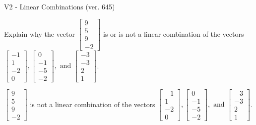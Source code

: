 \begin{exercise}
  \begin{exerciseTitle}V2 - Linear Combinations (ver. 645)\end{exerciseTitle}
  \begin{exerciseStatement}
    Explain why the vector \(\left[\begin{array}{c}
9 \\
5 \\
9 \\
-2
\end{array}\right]\)  is or is not a linear 
	combination of the vectors \(\left[\begin{array}{c}
-1 \\
1 \\
-2 \\
0
\end{array}\right] , \left[\begin{array}{c}
0 \\
-1 \\
-5 \\
-2
\end{array}\right] , \text{ and } \left[\begin{array}{c}
-3 \\
-3 \\
2 \\
1
\end{array}\right]\).
	


  \end{exerciseStatement}
  \begin{exerciseAnswer}
   \(\left[\begin{array}{c}
9 \\
5 \\
9 \\
-2
\end{array}\right]\) 
  	 is not  
	a linear combination of the vectors \(\left[\begin{array}{c}
-1 \\
1 \\
-2 \\
0
\end{array}\right] , \left[\begin{array}{c}
0 \\
-1 \\
-5 \\
-2
\end{array}\right] , \text{ and } \left[\begin{array}{c}
-3 \\
-3 \\
2 \\
1
\end{array}\right]\).

	
  


  \end{exerciseAnswer}
\end{exercise}